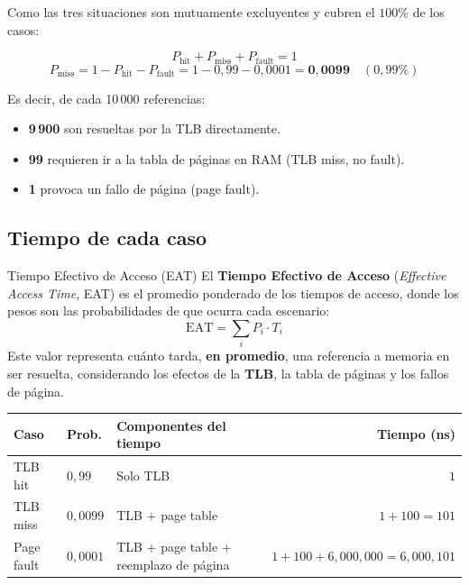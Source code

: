 \documentclass[12pt,letterpaper]{article}
\begin{document}
\noindent
Como las tres situaciones son mutuamente excluyentes y cubren el $100\%$ de los casos:

\begin{formulabox}
  \[
  P_{\text{hit}} + P_{\text{miss}} + P_{\text{fault}} = 1
  \]
  \[
  P_{\text{miss}} = 1 - P_{\text{hit}} - P_{\text{fault}}
  = 1 - 0{,}99 - 0{,}0001
  = \mathbf{0{,}0099} \quad (0{,}99\%)
  \]
\end{formulabox}

Es decir, de cada 10\,000 referencias:
\begin{itemize}
\item \textbf{9\,900} son resueltas por la TLB directamente.
\item \textbf{99} requieren ir a la tabla de páginas en RAM (TLB miss, no fault).
\item \textbf{1} provoca un fallo de página (page fault).
\end{itemize}

\subsection*{Tiempo de cada caso}
\begin{conceptbox}{Tiempo Efectivo de Acceso (EAT)}
  El \textbf{Tiempo Efectivo de Acceso} (\textit{Effective Access Time}, EAT) es el promedio ponderado de los tiempos de acceso, donde los pesos son las probabilidades de que ocurra cada escenario:
\[
  \text{EAT} = \sum_{i} P_i \cdot T_i
\]
Este valor representa cuánto tarda, \textbf{en promedio}, una referencia a memoria en ser resuelta, considerando los efectos de la \textbf{TLB}, la tabla de páginas y los fallos de página.
\end{conceptbox}

\begin{center}
  \renewcommand{\arraystretch}{1.4}
  \begin{tabular}{llp{5.3cm}r}
    \textbf{Caso} & \textbf{Prob.} & \textbf{Componentes del tiempo} & \textbf{Tiempo (ns)} \\
    \hline
    TLB hit   & $0{,}99$   & Solo TLB & $1$ \\
    TLB miss  & $0{,}0099$ & TLB {+} page table & $1 + 100 = 101$ \\
    Page fault & $0{,}0001$ & TLB {+} page table {+} reemplazo de página & $1 + 100 + 6{,}000{,}000 = 6{,}000{,}101$ \\
    \hline
  \end{tabular}
\end{center}
\end{document}
